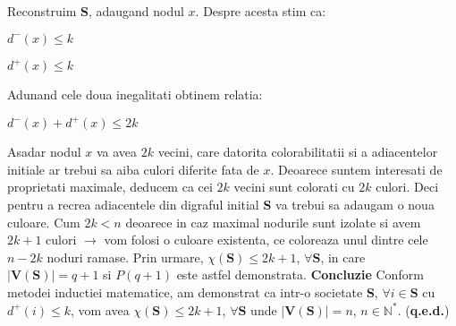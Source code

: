 \documentclass{article}
\begin{document}
    Reconstruim \textbf{S}, adaugand nodul $x$. Despre acesta stim ca:
    \begin{center}
    $ d^- (x) \leq k $
     \end{center}
    \begin{center}
    $ d^+ (x) \leq k $
    \end{center}
    Adunand cele doua inegalitati obtinem relatia:
    \begin{center}
    $ d^- (x) + d^+ (x) \leq 2k $
    \end{center}
    Asadar nodul $x$ va avea $2k$ vecini, care datorita colorabilitatii si a adiacentelor initiale ar trebui sa aiba culori diferite fata de $x$. Deoarece suntem interesati de proprietati maximale, deducem ca cei $2k$ vecini sunt colorati cu $2k$ culori.
    \newline 
    Deci pentru a recrea adiacentele din digraful initial \textbf{S} va trebui sa adaugam o noua culoare. Cum $2k<n$ deoarece in caz maximal nodurile sunt izolate si avem $2k+1$ culori $\rightarrow$ vom folosi o culoare existenta, ce coloreaza unul dintre cele $n-2k$ noduri ramase. Prin urmare, $\chi(\textbf{S}) \leq 2k+1$, $\forall \textbf{S}$, in care $|\textbf{V}(\textbf{S})|=q+1$ si $P(q+1)$ este astfel demonstrata.
    \newline
    \newline
    \textbf{Concluzie}
    Conform metodei inductiei matematice, am demonstrat ca intr-o societate \textbf{S}, $\forall i \in \textbf{S}$ cu $d^+ (i) \leq k$, vom avea $\chi(\textbf{S}) \leq 2k+1$, $\forall \textbf{S}$ unde $|\textbf{V}(\textbf{S})|=n$, $n \in \mathbb{N}^*$. (\textbf{q.e.d.})
\end{document}
